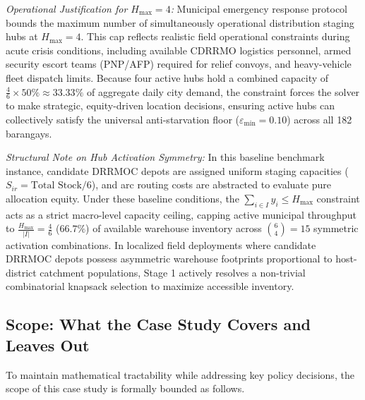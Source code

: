 \noindent \textit{Operational Justification for $H_{\max} = 4$:} Municipal emergency response protocol bounds the maximum number of simultaneously operational distribution staging hubs at $H_{\max} = 4$. This cap reflects realistic field operational constraints during acute crisis conditions, including available CDRRMO logistics personnel, armed security escort teams (PNP/AFP) required for relief convoys, and heavy-vehicle fleet dispatch limits. Because four active hubs hold a combined capacity of $\frac{4}{6} \times 50\% \approx 33.33\%$ of aggregate daily city demand, the constraint forces the solver to make strategic, equity-driven location decisions, ensuring active hubs can collectively satisfy the universal anti-starvation floor ($\varepsilon_{\min} = 0.10$) across all 182 barangays.

\noindent \textit{Structural Note on Hub Activation Symmetry:} In this baseline benchmark instance, candidate DRRMOC depots are assigned uniform staging capacities ($S_{ir} = \text{Total Stock} / 6$), and arc routing costs are abstracted to evaluate pure allocation equity. Under these baseline conditions, the $\sum_{i \in I} y_i \le H_{\max}$ constraint acts as a strict macro-level capacity ceiling, capping active municipal throughput to $\frac{H_{\max}}{|I|} = \frac{4}{6}$ ($66.7\%$) of available warehouse inventory across $\binom{6}{4} = 15$ symmetric activation combinations. In localized field deployments where candidate DRRMOC depots possess asymmetric warehouse footprints proportional to host-district catchment populations, Stage 1 actively resolves a non-trivial combinatorial knapsack selection to maximize accessible inventory.


\subsection{Scope: What the Case Study Covers and Leaves Out}
To maintain mathematical tractability while addressing key policy decisions, the scope of this case study is formally bounded as follows.

